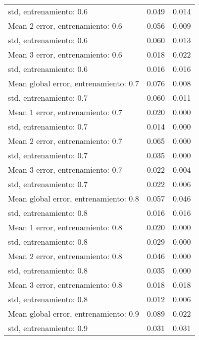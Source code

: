 \begin{longtable}{p{4cm}|p{1.5cm}|p{1.5cm}}
std, entrenamiento: 0.6               &              0.049 &        0.014 \\
Mean 2 error, entrenamiento: 0.6      &              0.056 &        0.009 \\
std, entrenamiento: 0.6               &              0.060 &        0.013 \\
Mean 3 error, entrenamiento: 0.6      &              0.018 &        0.022 \\
std, entrenamiento: 0.6               &              0.016 &        0.016 \\
Mean global error, entrenamiento: 0.7 &              0.076 &        0.008 \\
std, entrenamiento: 0.7               &              0.060 &        0.011 \\
Mean 1 error, entrenamiento: 0.7      &              0.020 &        0.000 \\
std, entrenamiento: 0.7               &              0.014 &        0.000 \\
Mean 2 error, entrenamiento: 0.7      &              0.065 &        0.000 \\
std, entrenamiento: 0.7               &              0.035 &        0.000 \\
Mean 3 error, entrenamiento: 0.7      &              0.022 &        0.004 \\
std, entrenamiento: 0.7               &              0.022 &        0.006 \\
Mean global error, entrenamiento: 0.8 &              0.057 &        0.046 \\
std, entrenamiento: 0.8               &              0.016 &        0.016 \\
Mean 1 error, entrenamiento: 0.8      &              0.020 &        0.000 \\
std, entrenamiento: 0.8               &              0.029 &        0.000 \\
Mean 2 error, entrenamiento: 0.8      &              0.046 &        0.000 \\
std, entrenamiento: 0.8               &              0.035 &        0.000 \\
Mean 3 error, entrenamiento: 0.8      &              0.018 &        0.018 \\
std, entrenamiento: 0.8               &              0.012 &        0.006 \\
Mean global error, entrenamiento: 0.9 &              0.089 &        0.022 \\
std, entrenamiento: 0.9               &              0.031 &        0.031 \\

\end{longtable}

